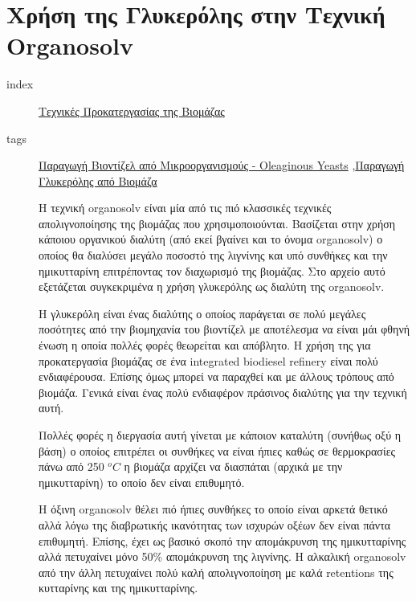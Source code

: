 \documentclass[11pt]{article}
\begin{document}
\section{Χρήση της Γλυκερόλης στην Τεχνική Organosolv}
\label{sec:org7f5cc61}
\begin{description}
\item[{index}] \href{\detokenize{../../../../org_roam/τεχνικες_προκατεργασιας_της_βιομαζας-09-11-22.org}}{Τεχνικές Προκατεργασίας της Βιομάζας}
\item[{tags}] \href{\detokenize{../../../../org_roam/παραγωγη_βιοντιζελ_απο_μικροοργανισμους_oleaginous_yeasts-13-10-22.org}}{Παραγωγή Βιοντίζελ από Μικροοργανισμούς - Oleaginous Yeasts} ,\href{\detokenize{../../../../org_roam/παραγωγη_γλυκερολης_απο_βιομαζα-13-10-22.org}}{Παραγωγή Γλυκερόλης από Βιομάζα} 

Η τεχνική organosolv είναι μία από τις πιό κλασσικές τεχνικές απολιγνοποίησης της βιομάζας που χρησιμοποιούνται. Βασίζεται στην χρήση κάποιου οργανικού διαλύτη (από εκεί βγαίνει και το όνομα organosolv) ο οποίος θα διαλύσει μεγάλο ποσοστό της λιγνίνης και υπό συνθήκες και την ημικυτταρίνη επιτρέποντας τον διαχωρισμό της βιομάζας. Στο αρχείο αυτό εξετάζεται συγκεκριμένα η χρήση γλυκερόλης ως διαλύτη της organosolv.

Η γλυκερόλη είναι ένας διαλύτης ο οποίος παράγεται σε πολύ μεγάλες ποσότητες από την βιομηχανία του βιοντίζελ με αποτέλεσμα να είναι μάι φθηνή ένωση η οποία πολλές φορές θεωρείται και απόβλητο. Η χρήση της για προκατεργασία βιομάζας σε ένα integrated biodiesel refinery είναι πολύ ενδιαφέρουσα. Επίσης όμως μπορεί να παραχθεί και με άλλους τρόπους από βιομάζα. Γενικά είναι ένας πολύ ενδιαφέρον πράσινος διαλύτης για την τεχνική αυτή.

Πολλές φορές η διεργασία αυτή γίνεται με κάποιον καταλύτη (συνήθως οξύ η βάση) ο οποίος επιτρέπει οι συνθήκες να είναι ήπιες καθώς σε θερμοκρασίες πάνω από 250 \(^oC\) η βιομάζα αρχίζει να διασπάται (αρχικά με την ημικυτταρίνη) το οποίο δεν είναι επιθυμητό.

Η όξινη organosolv θέλει πιό ήπιες συνθήκες το οποίο είναι αρκετά θετικό αλλά λόγω της διαβρωτικής ικανότητας των ισχυρών οξέων δεν είναι πάντα επιθυμητή. Επίσης, έχει ως βασικό σκοπό την απομάκρυνση της ημικυτταρίνης αλλά πετυχαίνει μόνο 50\% απομάκρυνση της λιγνίνης. Η αλκαλική organosolv από την άλλη πετυχαίνει πολύ καλή απολιγνοποίηση με καλά retentions της κυτταρίνης και της ημικυτταρίνης.


\end{description}
\end{document}
